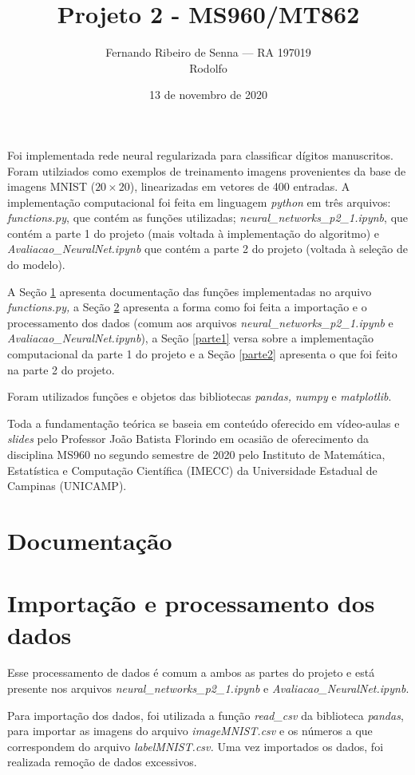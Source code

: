 \documentclass[12pt]{article}
\title{Projeto 2 - MS960/MT862}
\author{Fernando Ribeiro de Senna --- RA 197019\\
Rodolfo}
\date{13 de novembro de 2020}
\begin{document}
\maketitle

Foi implementada rede neural regularizada para classificar dígitos manuscritos. Foram utilziados como exemplos de treinamento imagens provenientes da base de imagens MNIST ($20 \times 20$), linearizadas em vetores de 400 entradas. A implementação computacional foi feita em linguagem \textit{python} em três arquivos: \textit{functions.py}, que contém as funções utilizadas; \textit{neural\_networks\_p2\_1.ipynb}, que contém a parte 1 do projeto (mais voltada à implementação do algoritmo) e \textit{Avaliacao\_NeuralNet.ipynb} que contém a parte 2 do projeto (voltada à seleção de do modelo).

A Seção \ref{doc} apresenta documentação das funções implementadas no arquivo \textit{functions.py,} a Seção \ref{dados} apresenta a forma como foi feita a importação e o processamento dos dados (comum aos arquivos \textit{neural\_networks\_p2\_1.ipynb} e \textit{Avaliacao\_NeuralNet.ipynb}), a Seção \ref{parte1} versa sobre a implementação computacional da parte 1 do projeto e a Seção \ref{parte2} apresenta o que foi feito na parte 2 do projeto.

Foram utilizados funções e objetos das bibliotecas \textit{pandas, numpy} e \textit{matplotlib}. 

Toda a fundamentação teórica se baseia em conteúdo oferecido em vídeo-aulas e \textit{slides} pelo Professor João Batista Florindo em ocasião de oferecimento da disciplina MS960 no segundo semestre de 2020 pelo Instituto de Matemática, Estatística e Computação Científica (IMECC) da Universidade Estadual de Campinas (UNICAMP).


\section{Documentação} \label{doc}

\section{Importação e processamento dos dados} \label{dados}
Esse processamento de dados é comum a ambos as partes do projeto e está presente nos arquivos \textit{neural\_networks\_p2\_1.ipynb} e \textit{Avaliacao\_NeuralNet.ipynb}.

Para importação dos dados, foi utilizada a função \textit{read\_csv} da biblioteca \textit{pandas}, para importar as imagens do arquivo \textit{imageMNIST.csv} e os números a que correspondem do arquivo \textit{labelMNIST.csv.} Uma vez importados os dados, foi realizada remoção de dados excessivos.
\end{document}
